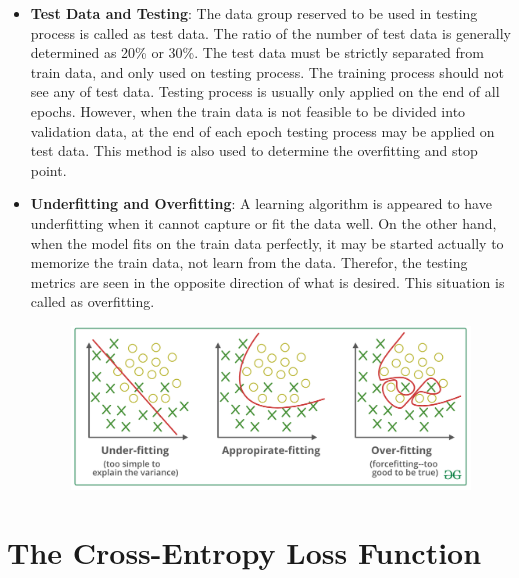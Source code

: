 \begin{itemize}
    \item \textbf{Test Data and Testing}: The data group reserved to be used in testing process is called as test data. The ratio of the number of test data is generally determined as 20\% or 30\%. The test data must be strictly separated from train data, and only used on testing process. The training process should not see any of test data. Testing process is usually only applied on the end of all epochs. However, when the train data is not feasible to be divided into validation data, at the end of each epoch testing process may be applied on test data. This method is also used to determine the overfitting and stop point.
    
    \item \textbf{Underfitting and Overfitting}: A learning algorithm is appeared to have underfitting when it cannot capture or fit the data well. On the other hand, when the model fits on the train data perfectly, it may be started actually to memorize the train data, not learn from the data. Therefor, the testing metrics are seen in the opposite direction of what is desired. This situation is called as overfitting.
    
    \begin{figure}[h]
    	\centering
    	\includegraphics[width=.8\linewidth]{fig/underfitting_overfitting.png}
    	\vspace*{1mm}
    	\label{underfitting_overfitting}
    \end{figure}

\end{itemize}

\section{The Cross-Entropy Loss Function}\label{sec:CH3_cross_entropy}

